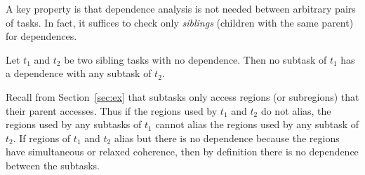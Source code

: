 %
%
%
%
%
%
%

A key property is that dependence analysis is not needed between arbitrary pairs of tasks.
In fact, it suffices to check only  {\em siblings} (children with the same parent) for dependences.
\begin{observation}
\label{obs:isolation}
\rm
Let $t_1$ and $t_2$ be two sibling tasks with no dependence.  Then no subtask of $t_1$ has a dependence with any subtask
of $t_2$.
\end{observation}
Recall from Section~\ref{sec:ex} that subtasks only access regions (or subregions) that their parent accesses.  
Thus if the regions used by $t_1$ and $t_2$ do not alias, the regions used by any subtasks of $t_1$ cannot
alias the regions used by any subtask of $t_2$.  If regions of $t_1$ and $t_2$ alias
but there is no dependence because the regions have simultaneous or relaxed coherence, then by definition there is no dependence between the subtasks.

